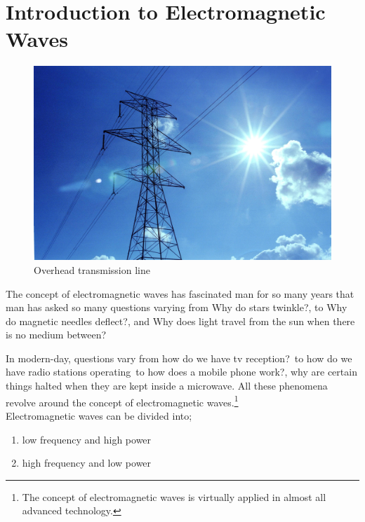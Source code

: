 \chapter{Introduction to Electromagnetic Waves}
\begin{figure}[h]
\centering
\includegraphics[width=1\linewidth]{./graphics/transmission1}
\caption{Overhead transmission line}
\end{figure}


The concept of electromagnetic waves has fascinated man for so many years that man has asked so many questions varying from \textquotesingle\textquotesingle Why do stars twinkle?\textquotesingle\textquotesingle, to \textquotesingle\textquotesingle Why do magnetic needles deflect?\textquotesingle\textquotesingle, and   \textquotesingle\textquotesingle Why does light travel from the sun when there is no medium between?\textquotesingle\textquotesingle \newline

In modern-day, questions vary from \textquotesingle\textquotesingle how do we have tv reception?\textquotesingle\textquotesingle\ to \textquotesingle\textquotesingle how do we have radio stations operating\textquotesingle\textquotesingle\ to \textquotesingle\textquotesingle how does a mobile phone work?\textquotesingle\textquotesingle, \textquotesingle\textquotesingle why are certain things halted when they are kept inside a microwave\textquotesingle\textquotesingle. All these phenomena revolve around the concept of electromagnetic waves.\footnote{The concept of electromagnetic waves is virtually applied in almost all advanced technology.}\\

Electromagnetic waves can be divided into;
\begin{enumerate}
\item low frequency and high power
\item high frequency and low power
\end{enumerate}


